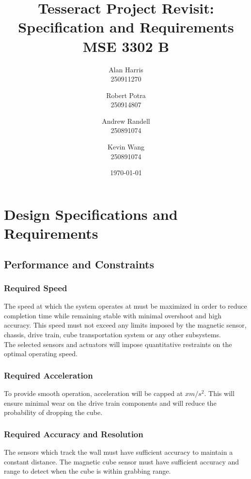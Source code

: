 \documentclass[12pt]{article}
\begin{document}
\title{\textbf{Tesseract Project Revisit:\\Specification and Requirements\\ MSE 3302 B}}
\author{
  Alan Harris\\
  250911270
  \and
  Robert Potra\\
  250914807
  \and
  Andrew Randell\\
  250891074
  \and
  Kevin Wang\\
  250891074
}
\date{\today}
\maketitle

\tableofcontents
\thispagestyle{empty}

\pagebreak
\setcounter{page}{1}
 
\section{Design Specifications and Requirements}
\subsection{Performance and Constraints}
\subsubsection{Required Speed}
The speed at which the system operates at must be maximized in order to reduce completion time while remaining stable with minimal overshoot and high accuracy. This speed must not exceed any limits imposed by the magnetic sensor, chassis, drive train, cube transportation system or any other subsystems. \\

The selected sensors and actuators will impose quantitative restraints on the optimal operating speed.

\subsubsection{Required Acceleration}
To provide smooth operation, acceleration will be capped at $x m/s^2$. This will ensure minimal wear on the drive train components and will reduce the probability of dropping the cube.
\subsubsection{Required Accuracy and Resolution}
The sensors which track the wall must have sufficient accuracy to maintain a constant distance. The magnetic cube sensor must have sufficient accuracy and range to detect when the cube is within grabbing range.
\end{document}
